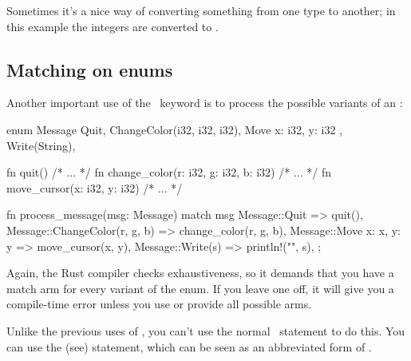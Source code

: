 Sometimes it's a nice way of converting something from one type to another; in this example the integers are converted to \String.

\subsection*{Matching on enums}

Another important use of the \match\ keyword is to process the possible variants of an \enum:

\begin{rustc}
enum Message {
    Quit,
    ChangeColor(i32, i32, i32),
    Move { x: i32, y: i32 },
    Write(String),
}

fn quit() { /* ... */ }
fn change_color(r: i32, g: i32, b: i32) { /* ... */ }
fn move_cursor(x: i32, y: i32) { /* ... */ }

fn process_message(msg: Message) {
    match msg {
        Message::Quit => quit(),
        Message::ChangeColor(r, g, b) => change_color(r, g, b),
        Message::Move { x: x, y: y } => move_cursor(x, y),
        Message::Write(s) => println!("{}", s),
    };
}
\end{rustc}

Again, the Rust compiler checks exhaustiveness, so it demands that you have a match arm for every variant of the enum. If you leave 
one off, it will give you a compile-time error unless you use \code{\_} or provide all possible arms.

\blank

Unlike the previous uses of \match, you can't use the normal \keyif\ statement to do this. You can use the  (see) 
statement, which can be seen as an abbreviated form of \match.
